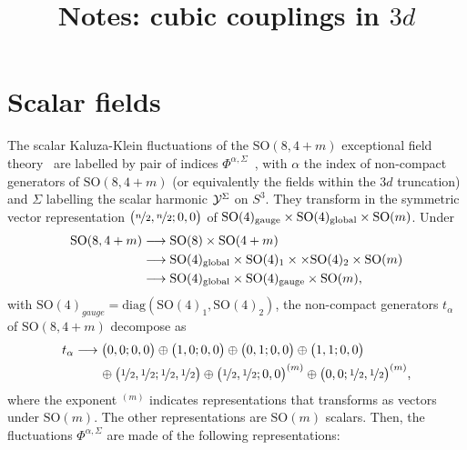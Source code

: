 \documentclass[11pt]{article}
\title{Notes: cubic couplings in $3d$}
\author{}
\newcommand{\SO}{\ensuremath{\mathrm{SO}}\xspace}
\begin{document}
\maketitle

\section*{Scalar fields}
The scalar Kaluza-Klein fluctuations of the $\SO(8,4+m)$ exceptional field theory~\cite{Hohm:2017wtr} are labelled by pair of indices $\Phi^{\alpha,\Sigma}$~\cite{Eloy:2020uix}, with $\alpha$ the index of non-compact generators of $\SO(8,4+m)$ (or equivalently the fields within the $3d$ truncation) and $\Sigma$ labelling the scalar harmonic ${\cal Y}^{\Sigma}$ on $S^{3}$. They transform in the symmetric vector representation $\big(\nicefrac{n}{2},\nicefrac{n}{2};0,0\big)$ of $\SO(4)_{\rm gauge} \times \SO(4)_{\rm global} \times \SO(m)$. Under
\begin{equation}
	\begin{split}
	\SO(8,4+m) & \longrightarrow \SO(8) \times \SO(4 + m) \\
						 & \longrightarrow \SO(4)_{\rm global} \times \SO(4)_{1} \times \times \SO(4)_{2} \times \SO(m) \\
						 & \longrightarrow \SO(4)_{\rm global} \times \SO(4)_{\rm gauge} \times \SO(m),
	\end{split}
\end{equation}
with $\SO(4)_{gauge}  =  \mathrm{diag}(\SO(4)_{1}, \SO(4)_{2})$, the non-compact generators $t_{\alpha}$ of $\SO(8,4+m)$ decompose as
\begin{equation}
	\begin{aligned}
		t_{\alpha} &\longrightarrow \big(0,0;0,0\big) \oplus \big(1,0;0,0\big) \oplus \big(0,1;0,0\big) \oplus \big(1,1;0,0\big) \\
		& \qquad \oplus \big(\nicefrac{1}{2},\nicefrac{1}{2};\nicefrac{1}{2},\nicefrac{1}{2}\big) \oplus \big(\nicefrac{1}{2},\nicefrac{1}{2};0,0\big)^{(m)} \oplus \big(0,0;\nicefrac{1}{2},\nicefrac{1}{2}\big)^{(m)},
	\end{aligned}
\end{equation}
where the exponent ${}^{(m)}$ indicates representations that transforms as vectors under $\SO(m)$. The other representations are $\SO(m)$ scalars. Then, the fluctuations $\Phi^{\alpha,\Sigma}$ are made of the following representations:
\end{document}
